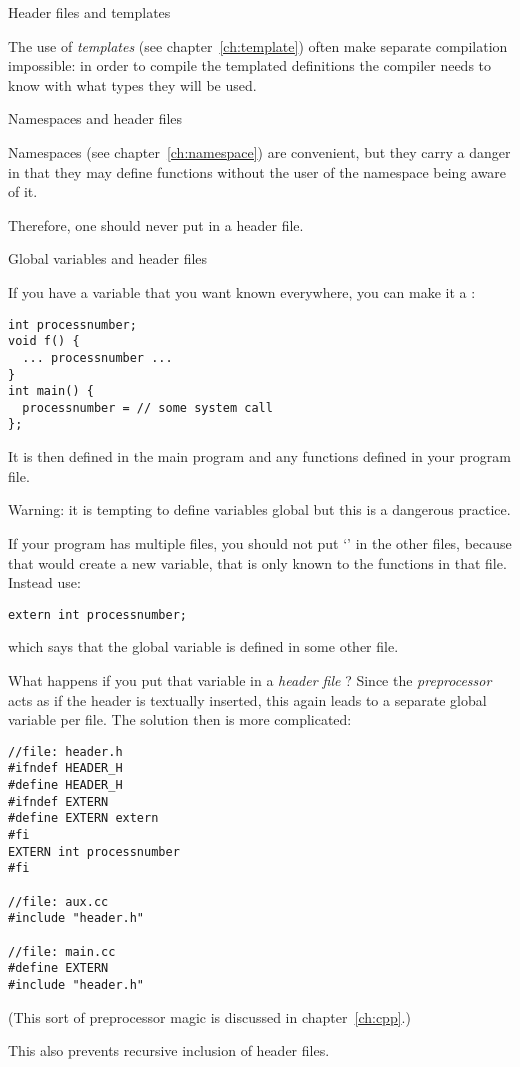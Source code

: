  {Header files and templates}

The use of \emph{templates}
(see chapter~\ref{ch:template})
often make separate compilation impossible: in order to compile the
templated definitions the compiler needs to know with what types they
will be used.

 {Namespaces and header files}

Namespaces
(see chapter~\ref{ch:namespace})
are convenient, but they carry a danger in that they may define
functions without the user of the namespace being aware of it.

Therefore, one should never put  in a header
file.

 {Global variables and header files}
\label{ex:globalvar}

If you have a variable that you want known everywhere, you can make it
a :
\begin{lstlisting}
int processnumber;
void f() {
  ... processnumber ...
}
int main() {
  processnumber = // some system call
};
\end{lstlisting}
It is then defined in the main program and any functions defined in your program file.

Warning: it is tempting to define variables global but this is a
dangerous practice.

If your program has multiple files, you should not put `'
in the other files, because that would create a new variable, that is
only known to the functions in that file. Instead use:
\begin{lstlisting}
extern int processnumber;
\end{lstlisting}
which says that the global variable  is defined in
some other file.

What happens if you put that variable in a
%
\emph{header file}%
%
? Since the
%
\emph{preprocessor}%
acts as if the header is textually inserted, this again leads to
a separate global variable per file. The solution then is more
complicated:
\begin{lstlisting}
//file: header.h
#ifndef HEADER_H
#define HEADER_H
#ifndef EXTERN
#define EXTERN extern
#fi
EXTERN int processnumber
#fi

//file: aux.cc
#include "header.h"

//file: main.cc
#define EXTERN
#include "header.h"
\end{lstlisting}
(This sort of preprocessor magic is discussed in chapter~\ref{ch:cpp}.)

This also prevents recursive inclusion of header files.

